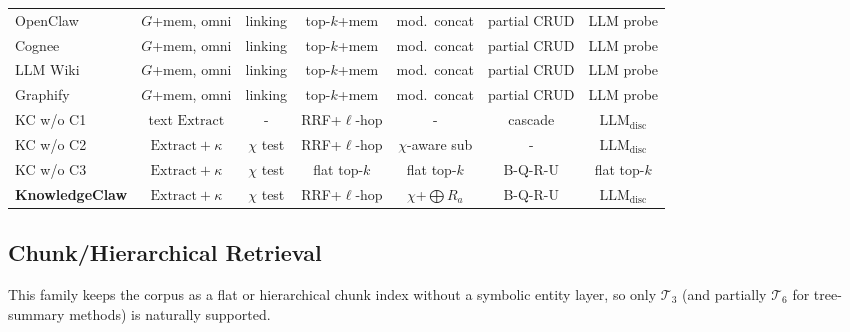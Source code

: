 \documentclass{article}
\begin{document}
\begin{table}[h]
{\begin{tabular}{l|cccccc}
\rowcolor{green!8} OpenClaw~\citep{OpenClaw} & $G$+mem, omni & linking & top-$k$+mem & mod.\ concat & partial CRUD & LLM probe \\
\rowcolor{green!8} Cognee~\citep{Cognee} & $G$+mem, omni & linking & top-$k$+mem & mod.\ concat & partial CRUD & LLM probe \\
\rowcolor{green!8} LLM Wiki~\citep{LLMWiki} & $G$+mem, omni & linking & top-$k$+mem & mod.\ concat & partial CRUD & LLM probe \\
\rowcolor{green!8} Graphify~\citep{Graphify} & $G$+mem, omni & linking & top-$k$+mem & mod.\ concat & partial CRUD & LLM probe \\
\midrule
\rowcolor{red!8} KC w/o C1 & text $\mathrm{Extract}$ & - & RRF+$\ell$-hop & - & cascade & $\mathrm{LLM}_{\mathrm{disc}}$ \\
\rowcolor{red!8} KC w/o C2 & $\mathrm{Extract}\!+\!\kappa$ & $\chi$ test & RRF+$\ell$-hop & $\chi$-aware sub & - & $\mathrm{LLM}_{\mathrm{disc}}$ \\
\rowcolor{red!8} KC w/o C3 & $\mathrm{Extract}\!+\!\kappa$ & $\chi$ test & flat top-$k$ & flat top-$k$ & B-Q-R-U & flat top-$k$ \\
\rowcolor{red!12} \textbf{KnowledgeClaw} & $\mathrm{Extract}\!+\!\kappa$ & $\chi$ test & RRF+$\ell$-hop & $\chi$+$\bigoplus R_a$ & B-Q-R-U & $\mathrm{LLM}_{\mathrm{disc}}$ \\
\bottomrule
\end{tabular}
}
\end{table}

\subsection{Chunk/Hierarchical Retrieval}\label{app:b-chunk}

This family keeps the corpus as a flat or hierarchical chunk index without a symbolic entity layer, so only $\mathcal{T}_3$ (and partially $\mathcal{T}_6$ for tree-summary methods) is naturally supported.
\end{document}
